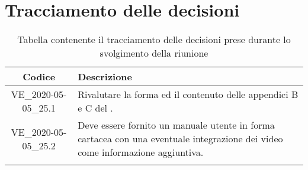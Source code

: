 \section*{Tracciamento delle decisioni}

\begin{center}
	\begin{longtable}{|c|p{12.25cm}|}
	\hline
	\rowcolor{lighter-grayer}
	\textbf{Codice} & \textbf{Descrizione} \\
	\hline
	\endfirsthead

	\hline
	VE\_2020-05-05\_25.1 & Rivalutare la forma ed il contenuto delle appendici B e C del \dext{PdQ}. \\
	\hline
	VE\_2020-05-05\_25.2 & Deve essere fornito un manuale utente in forma cartacea con una eventuale integrazione dei video come informazione aggiuntiva. \\
	\hline
	\caption{Tabella contenente il tracciamento delle decisioni prese durante lo svolgimento della riunione}
	\end{longtable}
\end{center}
